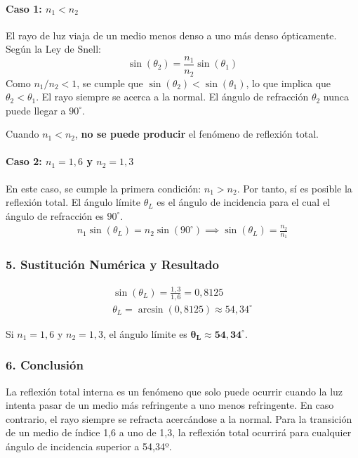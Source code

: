\paragraph{Caso 1: $n_1 < n_2$}
El rayo de luz viaja de un medio menos denso a uno más denso ópticamente. Según la Ley de Snell:
$$ \sin(\theta_2) = \frac{n_1}{n_2}\sin(\theta_1) $$
Como $n_1/n_2 < 1$, se cumple que $\sin(\theta_2) < \sin(\theta_1)$, lo que implica que $\theta_2 < \theta_1$. El rayo siempre se acerca a la normal. El ángulo de refracción $\theta_2$ nunca puede llegar a $90^\circ$.
\begin{cajaresultado}
Cuando $n_1 < n_2$, \textbf{no se puede producir} el fenómeno de reflexión total.
\end{cajaresultado}

\paragraph{Caso 2: $n_1=1,6$ y $n_2=1,3$}
En este caso, se cumple la primera condición: $n_1 > n_2$. Por tanto, sí es posible la reflexión total.
El ángulo límite $\theta_L$ es el ángulo de incidencia para el cual el ángulo de refracción es $90^\circ$.
\begin{gather}
    n_1\sin(\theta_L) = n_2\sin(90^\circ) \implies \sin(\theta_L) = \frac{n_2}{n_1}
\end{gather}
\subsubsection*{5. Sustitución Numérica y Resultado}
\begin{gather}
    \sin(\theta_L) = \frac{1,3}{1,6} = 0,8125 \\
    \theta_L = \arcsin(0,8125) \approx 54,34^\circ
\end{gather}
\begin{cajaresultado}
Si $n_1=1,6$ y $n_2=1,3$, el ángulo límite es $\boldsymbol{\theta_L \approx 54,34^\circ}$.
\end{cajaresultado}

\subsubsection*{6. Conclusión}
\begin{cajaconclusion}
La reflexión total interna es un fenómeno que solo puede ocurrir cuando la luz intenta pasar de un medio más refringente a uno menos refringente. En caso contrario, el rayo siempre se refracta acercándose a la normal. Para la transición de un medio de índice 1,6 a uno de 1,3, la reflexión total ocurrirá para cualquier ángulo de incidencia superior a 54,34º.
\end{cajaconclusion}

